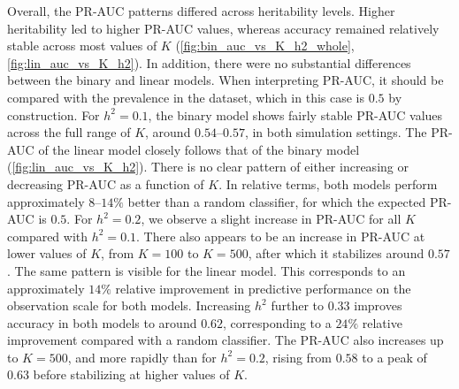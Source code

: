 Overall, the PR-AUC patterns differed across heritability levels. Higher heritability led to higher PR-AUC values, whereas accuracy remained relatively stable across most values of $K$ (\autoref{fig:bin_auc_vs_K_h2_whole}, \autoref{fig:lin_auc_vs_K_h2}). In addition, there were no substantial differences between the binary and linear models.
%
When interpreting PR-AUC, it should be compared with the prevalence in the dataset, which in this case is $0.5$ by construction. For $h^2 = 0.1$, the binary model shows fairly stable PR-AUC values across the full range of $K$, around $0.54$--$0.57$, in both simulation settings. The PR-AUC of the linear model closely follows that of the binary model (\autoref{fig:lin_auc_vs_K_h2}). There is no clear pattern of either increasing or decreasing PR-AUC as a function of $K$. In relative terms, both models perform approximately $8$--$14\%$ better than a random classifier, for which the expected PR-AUC is $0.5$.
%
For $h^2 = 0.2$, we observe a slight increase in PR-AUC for all $K$ compared with $h^2 = 0.1$. There also appears to be an increase in PR-AUC at lower values of $K$, from $K = 100$ to $K = 500$, after which it stabilizes around $0.57$. The same pattern is visible for the linear model. This corresponds to an approximately $14\%$ relative improvement in predictive performance on the observation scale for both models.
%
Increasing $h^2$ further to $0.33$ improves accuracy in both models to around $0.62$, corresponding to a $24\%$ relative improvement compared with a random classifier. The PR-AUC also increases up to $K = 500$, and more rapidly than for $h^2 = 0.2$, rising from $0.58$ to a peak of $0.63$ before stabilizing at higher values of $K$. 
\\


